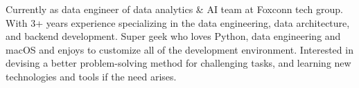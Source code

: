 

\begin{cvparagraph}

Currently as data engineer of data analytics \& AI team at Foxconn tech group. With 3+ years experience specializing in the data engineering, data architecture, and backend development. Super geek who loves Python, data engineering and macOS and enjoys to customize all of the development environment. Interested in devising a better problem-solving method for challenging tasks, and learning new technologies and tools if the need arises.
\end{cvparagraph}
